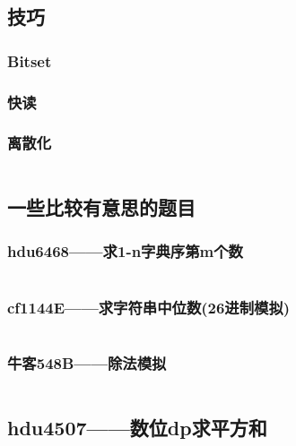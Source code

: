 \documentclass[a4paper,9pt]{article}
\begin{document}
\subsection{技巧}
\subsubsection{Bitset}

\subsubsection{快读}
\subsubsection{离散化}
\inputminted[]{c++}{Template/Other/Discretization.cpp}
\subsection{一些比较有意思的题目}
\subsubsection{hdu6468——求1-n字典序第m个数}
\inputminted[]{c++}{Template/Other/hdu6468.cpp}
\subsubsection{cf1144E——求字符串中位数(26进制模拟)}
\inputminted[]{c++}{Template/Other/cf1144E.cpp}
\subsubsection{牛客548B——除法模拟}
\inputminted[]{c++}{Template/Other/548B.cpp}
\subsection{hdu4507——数位dp求平方和}
\inputminted[]{c++}{Template/Other/hdu4507.cpp}
\end{document}
